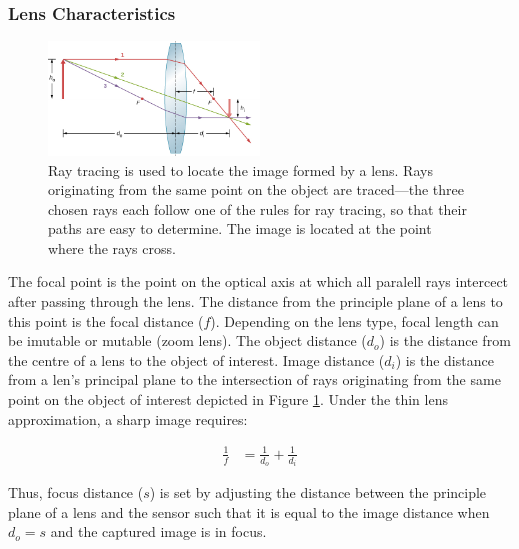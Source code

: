 \documentclass[11pt]{article}
\begin{document}
\subsubsection{Lens Characteristics}

\begin{figure}[hbt]
    \centering
    \includegraphics[width=0.5\textwidth]{img/sensors/thin_lens.png}
    \caption{Ray tracing is used to locate the image formed by a lens. Rays originating from the same point on the object are traced—the three chosen rays each follow one of the rules for ray tracing, so that their paths are easy to determine. The image is located at the point where the rays cross.}
    \label{fig:ThinLens}
\end{figure}

\noindent
The focal point is the point on the optical axis at which all paralell rays intercect after passing through the lens. The distance from the principle plane of a lens to this point is the focal distance ($f$). Depending on the lens type, focal length can be imutable or mutable (zoom lens). The object distance ($d_o$) is the distance from the centre of a lens to the object of interest. Image distance ($d_i$) is the distance from a len's principal plane to the intersection of rays originating from the same point on the object of interest depicted in Figure \ref{fig:ThinLens}. Under the thin lens approximation, a sharp image requires:

\begin{align}
    \frac{1}{f} &= \frac{1}{d_o} + \frac{1}{d_i} \label{eq:ThinLensConstraint}
\end{align}

\noindent
Thus, focus distance ($s$) is set by adjusting the distance between the principle plane of a lens and the sensor such that it is equal to the image distance when $d_o = s$ and the captured image is in focus.
\end{document}
